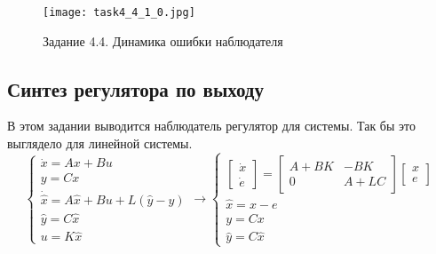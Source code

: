 \begin{figure}[]
    \centering
    \texttt{[image: task4\_4\_1\_0.jpg]}
    \caption{Задание 4.4. Динамика ошибки наблюдателя}
    \label{fig:task4_4_3}
\end{figure}


\subsection{Синтез регулятора по выходу}
В этом задании выводится наблюдатель регулятор для системы. Так бы это выглядело для линейной системы.
\[
        \begin{cases}
                \dot{x} = A x + B u\\
                y = C x \\
                \dot{\hat{x}} = A \hat{x} + B u + L(\hat{y} - y) \\
                \hat{y} = C \hat{x} \\
                u = K \hat{x}
        \end{cases} \rightarrow
        \begin{cases}
            \begin{bmatrix} 
                \dot{x} \\
                \dot{e}
            \end{bmatrix} = 
            \begin{bmatrix} 
                A + BK & -BK\\
                0 & A + LC
            \end{bmatrix}
            \begin{bmatrix} 
              x \\
              e
          \end{bmatrix} 
            \\
            \hat{x} = x - e \\
            y = Cx \\
            \hat{y} = C \hat{x}
         \end{cases}
\]

